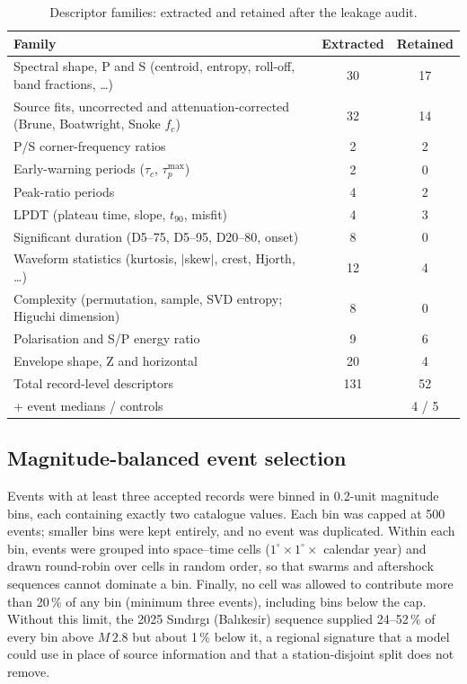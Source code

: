 \documentclass[11pt,a4paper]{article}
\newcommand{\fc}{f_c}
\begin{document}
\begin{table}[ht]
  \centering\small
  \caption{Descriptor families: extracted and retained after the leakage audit.}
  \label{tab:features}
  \begin{tabularx}{\textwidth}{Lcc}
    \toprule
    Family & Extracted & Retained \\
    \midrule
    Spectral shape, P and S (centroid, entropy, roll-off, band fractions, \dots) & 30 & 17 \\
    Source fits, uncorrected and attenuation-corrected (Brune, Boatwright, Snoke $\fc$) & 32 & 14 \\
    P/S corner-frequency ratios & 2 & 2 \\
    Early-warning periods ($\tau_c$, $\tau_p^{\max}$) & 2 & 0 \\
    Peak-ratio periods & 4 & 2 \\
    LPDT (plateau time, slope, $t_{90}$, misfit) & 4 & 3 \\
    Significant duration (D5--75, D5--95, D20--80, onset) & 8 & 0 \\
    Waveform statistics (kurtosis, $|$skew$|$, crest, Hjorth, \dots) & 12 & 4 \\
    Complexity (permutation, sample, SVD entropy; Higuchi dimension) & 8 & 0 \\
    Polarisation and S/P energy ratio & 9 & 6 \\
    Envelope shape, Z and horizontal & 20 & 4 \\
    \midrule
    Total record-level descriptors & 131 & 52 \\
    \quad + event medians / controls & & 4 / 5 \\
    \bottomrule
  \end{tabularx}
\end{table}

\subsection{Magnitude-balanced event selection}
Events with at least three accepted records were binned in 0.2-unit
magnitude bins, each containing exactly two catalogue values. Each bin was
capped at 500 events; smaller bins were kept entirely, and no event was
duplicated. Within each bin, events were grouped into space--time cells
($1^\circ \times 1^\circ \times$ calendar year) and drawn round-robin over cells in
random order, so that swarms and aftershock sequences cannot dominate a bin.
Finally, no cell was allowed to contribute more than 20\,\% of any bin
(minimum three events), including bins below the cap. Without this
limit, the 2025 Sındırgı (Balıkesir) sequence supplied 24--52\,\% of every bin
above $M\,2.8$ but about 1\,\% below it, a regional signature that a model could
use in place of source information and that a station-disjoint split does not
remove.
\end{document}

